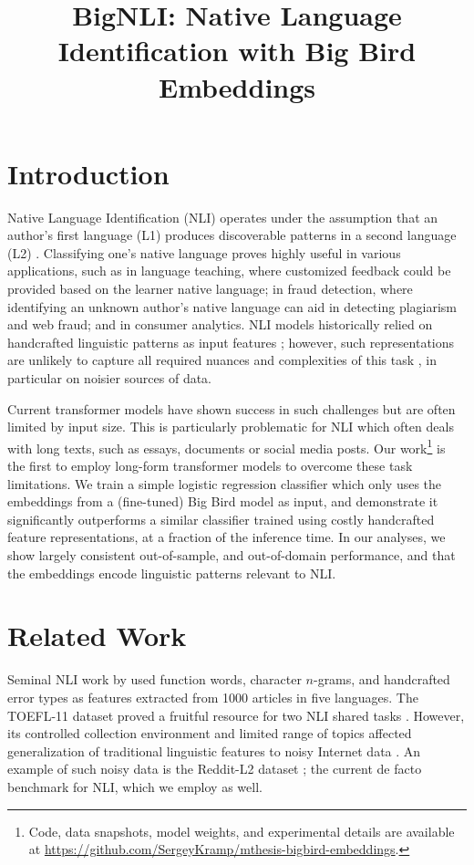 \documentclass[10pt, a4paper]{article}
\title{BigNLI: Native Language Identification with Big Bird Embeddings}
\date{}
\begin{document}
\maketitleabstract


\section{Introduction} \label{sec:introduction}

Native Language Identification (NLI) operates under the assumption that an author's first language (L1) produces discoverable patterns in a second language (L2) \cite{Odlin1989,10.3389/fpsyg.2013.00226}. Classifying one's native language proves highly useful in various applications, such as in language teaching, where customized feedback could be provided based on the learner native language; in fraud detection, where identifying an unknown author's native language can aid in detecting plagiarism and web fraud; and in consumer analytics. NLI models historically relied on handcrafted linguistic patterns as input features \cite{DBLP:conf/isi/KoppelSZ05,tetreault-shared-task-13,DBLP:conf/bea/CiminoDVM13,DBLP:conf/acl/ChenSN17}; however, such representations are unlikely to capture all required nuances and complexities of this task \cite{DBLP:conf/ecir/MoschittiB04}, in particular on noisier sources of data.

Current transformer models \cite{DBLP:conf/nips/VaswaniSPUJGKP17} have shown success in such challenges \cite{DBLP:conf/nips/BrownMRSKDNSSAA20} but are often limited by input size. This is particularly problematic for NLI which often deals with long texts, such as essays, documents or social media posts. Our work\footnote{Code, data snapshots, model weights, and experimental details are available at \url{https://github.com/SergeyKramp/mthesis-bigbird-embeddings}.} is the first to employ long-form transformer models to overcome these task limitations. We train a simple logistic regression classifier which only uses the embeddings from a (fine-tuned) Big Bird \cite{DBLP:conf/nips/ZaheerGDAAOPRWY20} model as input, and demonstrate it significantly outperforms a similar classifier trained using costly handcrafted feature representations, at a fraction of the inference time. In our analyses, we show largely consistent out-of-sample, and out-of-domain performance, and that the embeddings encode linguistic patterns relevant to NLI. 


\section{Related Work}

Seminal NLI work by  used function words, character $n$-grams, and handcrafted error types as features extracted from 1000 articles in five languages. The TOEFL-11 dataset \cite{https://doi.org/10.1002/j.2333-8504.2013.tb02331.x} proved a fruitful resource for two NLI shared tasks \cite{tetreault-shared-task-13,DBLP:conf/bea/MalmasiECTPHNQ17}. However, its controlled collection environment and limited range of topics affected generalization of traditional linguistic features to noisy Internet data \cite{DBLP:conf/ijcnlp/BaldwinCLMW13}. An example of such noisy data is the Reddit-L2 dataset \cite{DBLP:journals/tacl/RabinovichTW18}; the current de facto benchmark for NLI, which we employ as well.
\end{document}
